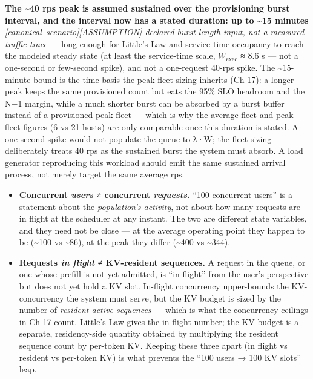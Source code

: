 \textbf{The \textasciitilde40 rps peak is assumed sustained over the
provisioning burst interval, and the interval now has a stated duration:
up to \textasciitilde15 minutes} \emph{\mbox{{[}canonical
scenario{]}}\hspace{0pt}\mbox{{[}ASSUMPTION{]}} declared burst-length input, not a measured
traffic trace} --- long enough for Little's Law and service-time
occupancy to reach the modeled steady state (at least the service-time
scale, \(W_{\mathrm{exec}}\) ≈ 8.6 s --- not a one-second or few-second
spike), and not a one-request 40-rps spike. The \textasciitilde15-minute
bound is the time basis the peak-fleet sizing inherits (Ch 17): a longer
peak keeps the same provisioned count but eats the 95\% SLO headroom and
the N−1 margin, while a much shorter burst can be absorbed by a burst
buffer instead of a provisioned peak fleet --- which is why the
average-fleet and peak-fleet figures (6 vs 21 hosts) are only comparable
once this duration is stated. A one-second spike would not populate the
queue to λ·W; the fleet sizing deliberately treats 40 rps as the
sustained burst the system must absorb. A load generator reproducing
this workload should emit the same sustained arrival process, not merely
target the same average rps.

\begin{itemize}
\tightlist
\item
  \textbf{Concurrent \emph{users} ≠ concurrent \emph{requests}.} ``100
  concurrent users'' is a statement about the \emph{population's
  activity}, not about how many requests are in flight at the scheduler
  at any instant. The two are different state variables, and they need
  not be close --- at the average operating point they happen to be
  (\textasciitilde100 vs \textasciitilde86), at the peak they differ
  (\textasciitilde400 vs \textasciitilde344).
\item
  \textbf{Requests \emph{in flight} ≠ KV-resident sequences.} A request
  in the queue, or one whose prefill is not yet admitted, is ``in
  flight'' from the user's perspective but does not yet hold a KV slot.
  In-flight concurrency upper-bounds the KV-concurrency the system must
  serve, but the KV budget is sized by the number of \emph{resident
  active sequences} --- which is what the concurrency ceilings in Ch 17
  count. Little's Law gives the in-flight number; the KV budget is a
  separate, residency-side quantity obtained by multiplying the resident
  sequence count by per-token KV. Keeping these three apart (in flight
  vs resident vs per-token KV) is what prevents the ``100 users → 100 KV
  slots'' leap.
\end{itemize}

